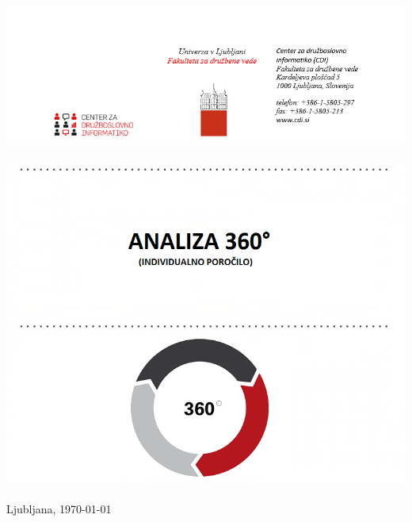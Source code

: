 \documentclass[11pt,a4paper]{report}
\begin{document}
	\begin{titlepage}
		\begin{center}
                     \vspace*{-8.5\baselineskip}  %
		\includegraphics[width=18cm]{../latexkosi/logo/CDI1.png}~\\[4cm]
		\includegraphics[width=17.5cm]{../latexkosi/logo/CDI_naslovnica.png}~\\[4cm]
		{\large Ljubljana, \today}
		\end{center}
	\end{titlepage}
\tableofcontents
\end{document}
